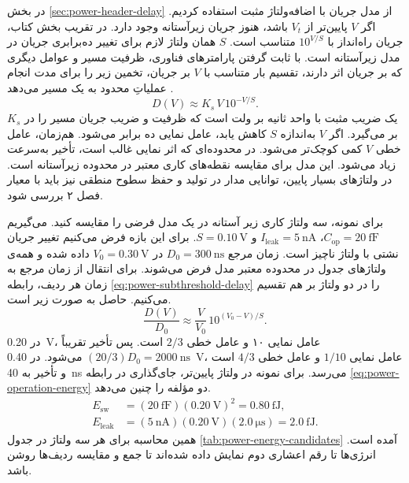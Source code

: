 در بخش \ref{sec:power-header-delay} از مدل جریان با اضافه‌ولتاژ
مثبت استفاده کردیم. اگر \(V\) پایین‌تر از \(V_t\) باشد، هنوز
جریان زیرآستانه وجود دارد. در تقریب بخش  کتاب،
جریان راه‌انداز با \(10^{V/S}\) متناسب است. \(S\) همان ولتاژ لازم
برای تغییر ده‌برابری جریان در مدل زیرآستانه است. با ثابت گرفتن
پارامترهای فناوری، ظرفیت مسیر و عوامل دیگری که بر جریان اثر دارند،
تقسیم بار متناسب با \(V\) بر جریان، تخمین زیر را برای مدت انجام
عملیاتِ محدود به یک مسیر می‌دهد
\cite[رابطه‌های  و ،
صفحات ۱۶۲ و ۲۰۲]{weste}.
\begin{equation}
  D(V)\approx K_s\,V\,10^{-V/S}.
  \label{eq:power-subthreshold-delay}
\end{equation}
\(K_s\) یک ضریب مثبت با واحد ثانیه بر ولت است که ظرفیت و ضریب
جریان مسیر را در بر می‌گیرد. اگر \(V\) به‌اندازه \(S\) کاهش
یابد، عامل نمایی ده برابر می‌شود. هم‌زمان، عامل خطی \(V\) کمی
کوچک‌تر می‌شود. در محدوده‌ای که اثر نمایی غالب است، تأخیر به‌سرعت
زیاد می‌شود. این مدل برای مقایسه نقطه‌های کاری معتبر در محدوده
زیرآستانه است. در ولتاژهای بسیار پایین، توانایی مدار در تولید و
حفظ سطوح منطقی نیز باید با معیار فصل ۲ بررسی شود.

برای نمونه، سه ولتاژ کاری زیر آستانه در یک مدل فرضی را مقایسه کنید.
می‌گیریم \(C_{\mathrm{op}}=\qty{20}{\femto\farad}\)،
\(I_{\mathrm{leak}}=\qty{5}{\nano\ampere}\) و
\(S=\qty{0.10}{\volt}\). برای این بازه فرض می‌کنیم تغییر
جریان نشتی با ولتاژ ناچیز است. زمان مرجع \(D_0=\qty{300}{\nano\second}\)
در \(V_0=\qty{0.30}{\volt}\) داده شده و همه‌ی ولتاژهای جدول در
محدوده معتبر مدل فرض می‌شوند. برای انتقال از زمان مرجع به زمان هر
ردیف، رابطه \eqref{eq:power-subthreshold-delay} را در دو ولتاژ بر
هم تقسیم می‌کنیم. حاصل به صورت زیر است.
\[
  \frac{D(V)}{D_0}\approx
    \frac{V}{V_0}\,10^{(V_0-V)/S}.
\]
در \qty{0.20}{\volt}، عامل نمایی ۱۰ و عامل خطی \(2/3\) است.
پس تأخیر تقریباً \((20/3)D_0=\qty{2000}{\nano\second}\) می‌شود.
در \qty{0.40}{\volt}، عامل نمایی \(1/10\) و عامل خطی \(4/3\)
است و تأخیر به \qty{40}{\nano\second} می‌رسد. برای نمونه در
ولتاژ پایین‌تر، جای‌گذاری در رابطه \eqref{eq:power-operation-energy}
دو مؤلفه را چنین می‌دهد.
\[
  \begin{aligned}
    E_{\mathrm{sw}}&=(\qty{20}{\femto\farad})(\qty{0.20}{\volt})^2
                     =\qty{0.80}{\femto\joule},\\
    E_{\mathrm{leak}}&=(\qty{5}{\nano\ampere})(\qty{0.20}{\volt})
                         (\qty{2.0}{\micro\second})
                     =\qty{2.0}{\femto\joule}.
  \end{aligned}
\]
همین محاسبه برای هر سه ولتاژ در جدول \ref{tab:power-energy-candidates}
آمده است. انرژی‌ها تا رقم اعشاری دوم نمایش داده شده‌اند تا جمع و
مقایسه ردیف‌ها روشن باشد.

